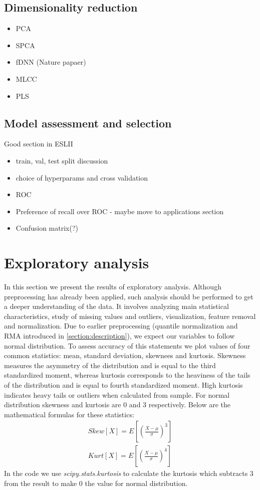 \documentclass[12pt, wide]{mwart}
\begin{document}
\subsection{Dimensionality reduction}

\begin{itemize}
        \item PCA
        \item SPCA
        \item fDNN (Nature papaer)
        \item MLCC
        \item PLS
\end{itemize}

\subsection{Model assessment and selection} \label{section:selection}

Good section in ESLII


\begin{itemize}
    \item train, val, test split discussion 
    \item choice of hyperparams and cross validation
    \item ROC
    \item Preference of recall over ROC  - maybe move to applications section
    \item Confusion matrix(?)
\end{itemize}


\section{Exploratory analysis}

In this section we present the results of exploratory analysis. Although preprocessing has already been applied, such analysis should be performed to get a deeper understanding of the data. It involves analyzing main statistical characteristics, study of missing values and outliers, visualization, feature removal and normalization. Due to earlier preprocessing (quantile normalization and RMA introduced in \ref{section:description}), we expect our variables to follow normal distribution. To assess accuracy of this statements we plot values of four common statistics: mean, standard deviation, skewnees and kurtosis. Skewness measures the asymmetry of the distribution and is equal to the third standardized moment, whereas kurtosis corresponds to the heaviness of the tails of the distribution and is equal to fourth standardized moment. High kurtosis indicates heavy tails or outliers when calculated from sample. For normal distribution skewness and kurtosis are $0$ and $3$ respectively. Below are the mathematical formulas for these statistics:
\begin{align}
    Skew[X] = E\left[\left(\frac{X-\mu}{\sigma}\right)^3 \right] \nonumber \\
    Kurt[X] = E\left[\left(\frac{X-\mu}{\sigma}\right)^4 \right] \nonumber
\end{align}
In the code we use \textit{scipy.stats.kurtosis} to calculate the kurtosis which subtracts $3$ from the result to make $0$ the value for normal distribution. 
\end{document}
